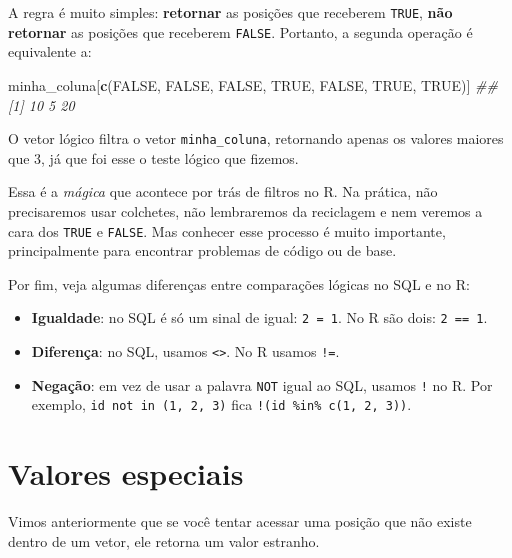\documentclass[]{book}
\newenvironment{Shaded}{\begin{snugshade}}{\end{snugshade}}
\newcommand{\CommentTok}[1]{\textcolor[rgb]{0.56,0.35,0.01}{\textit{#1}}}
\newcommand{\KeywordTok}[1]{\textcolor[rgb]{0.13,0.29,0.53}{\textbf{#1}}}
\newcommand{\NormalTok}[1]{#1}
\newcommand{\OtherTok}[1]{\textcolor[rgb]{0.56,0.35,0.01}{#1}}
\providecommand{\tightlist}{%
  \setlength{\itemsep}{0pt}\setlength{\parskip}{0pt}}
\begin{document}
A regra é muito simples: \textbf{retornar} as posições que receberem \texttt{TRUE}, \textbf{não retornar} as posições que receberem \texttt{FALSE}. Portanto, a segunda operação é equivalente a:

\begin{Shaded}
\begin{Highlighting}[]
\NormalTok{minha_coluna[}\KeywordTok{c}\NormalTok{(}\OtherTok{FALSE}\NormalTok{, }\OtherTok{FALSE}\NormalTok{, }\OtherTok{FALSE}\NormalTok{, }\OtherTok{TRUE}\NormalTok{, }\OtherTok{FALSE}\NormalTok{, }\OtherTok{TRUE}\NormalTok{, }\OtherTok{TRUE}\NormalTok{)]}
\CommentTok{## [1] 10  5 20}
\end{Highlighting}
\end{Shaded}

O vetor lógico filtra o vetor \texttt{minha\_coluna}, retornando apenas os valores maiores que 3, já que foi esse o teste lógico que fizemos.

Essa é a \emph{mágica} que acontece por trás de filtros no R. Na prática, não precisaremos usar colchetes, não lembraremos da reciclagem e nem veremos a cara dos \texttt{TRUE} e \texttt{FALSE}. Mas conhecer esse processo é muito importante, principalmente para encontrar problemas de código ou de base.

Por fim, veja algumas diferenças entre comparações lógicas no SQL e no R:

\begin{itemize}
\tightlist
\item
  \textbf{Igualdade}: no SQL é só um sinal de igual: \texttt{2\ =\ 1}. No R são dois: \texttt{2\ ==\ 1}.
\item
  \textbf{Diferença}: no SQL, usamos \texttt{\textless{}\textgreater{}}. No R usamos \texttt{!=}.
\item
  \textbf{Negação}: em vez de usar a palavra \texttt{NOT} igual ao SQL, usamos \texttt{!} no R. Por exemplo, \texttt{id\ not\ in\ (\textquotesingle{}1\textquotesingle{},\ \textquotesingle{}2\textquotesingle{},\ \textquotesingle{}3\textquotesingle{})} fica \texttt{!(id\ \%in\%\ c(1,\ 2,\ 3))}.
\end{itemize}

\hypertarget{valoresEspeciais}{%
\section{Valores especiais}\label{valoresEspeciais}}

Vimos anteriormente que se você tentar acessar uma posição que não existe dentro de um vetor, ele retorna um valor estranho.
\end{document}
